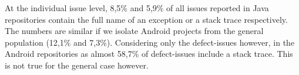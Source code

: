 \documentclass[conference]{IEEEtran}
\begin{document}
At the individual issue level, 
8,5\% and 5,9\% of all issues reported in Java repositories contain the full name of an exception or a stack trace respectively. The numbers are similar if we isolate Android projects from the general population (12,1\% and 7,3\%). Considering only the defect-issues however, in the
Android repositories as almost 58,7\% of defect-issues include a stack trace. This is not true for the general case however.






\noindent {}



    


\end{document}

